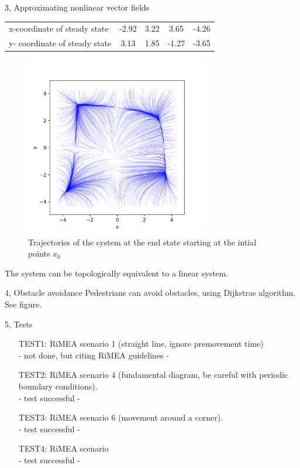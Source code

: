 \documentclass[10pt,a4paper]{article}
\begin{document}
\begin{task}{3, Approximating nonlinear vector fields}
\begin{tabular}{|l|c|c|c|c|}
\hline
x-coordinate of steady state& -2.92&3.22&3.65&-4.26\\
y- coordinate of steady state& 3.13&1.85&-1.27&-3.65\\
\hline
\end{tabular}
\begin{figure}[H]
\centering
\includegraphics[width=0.7\textwidth]{../plots/task3_part32.png}
\caption{Trajectories of the system at the end state starting at the intial points $x_0$}
\label{fig:task3_part3}
\end{figure}
The system can be topologically equivalent to a linear system.
\end{task}
\begin{task}{4, Obstacle avoidance}
Pedestrians can avoid obstacles, using Dijkstras algorithm. See figure.
\end{task}
\begin{task}{5, Tests}
\begin{enumerate}
\item[TEST1:] RiMEA scenario 1 (straight line, ignore premovement time)\\
- not done, but citing RiMEA guidelines -
\item[TEST2:] RiMEA scenario 4 (fundamental diagram, be careful with periodic boundary conditions).\\
- test successful - 
\item[TEST3:] RiMEA scenario 6 (movement around a corner).\\
- test successful - 
\item[TEST4:] RiMEA scenario\\
- test successful - 
\end{enumerate}
\end{task}
\end{document}
